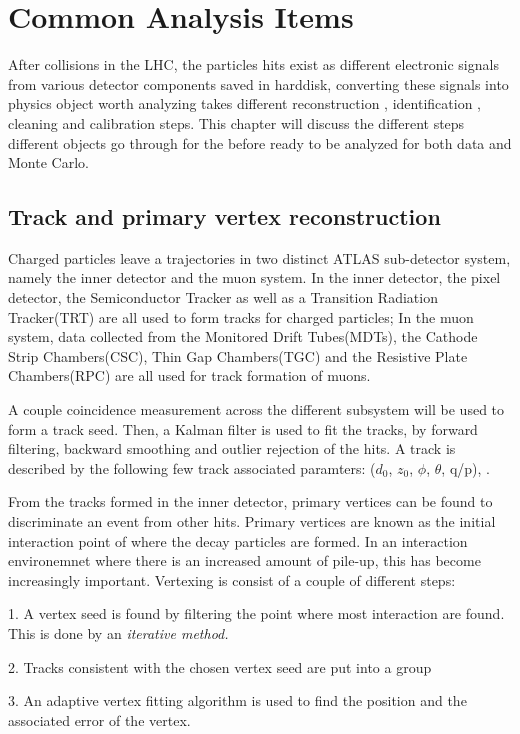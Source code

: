 \chapter{Common Analysis Items}
After collisions in the LHC, the particles hits exist as different electronic signals from various detector components saved in harddisk, converting these signals into physics object worth analyzing takes different reconstruction , identification , cleaning and calibration steps. This chapter will discuss the different steps different objects go through for the before ready to be analyzed for both data and Monte Carlo. 

\section{Track and primary vertex reconstruction}

Charged particles leave a trajectories in two distinct ATLAS sub-detector system, namely the inner detector and the muon system. In the inner detector, the pixel detector, the Semiconductor Tracker as well as a Transition Radiation Tracker(TRT) are all used to form tracks for charged particles; In the muon system, data collected from the Monitored Drift Tubes(MDTs), the Cathode Strip Chambers(CSC), Thin Gap Chambers(TGC) and the Resistive Plate Chambers(RPC) are all used for
track formation of muons. 

A couple coincidence measurement across the different subsystem will be used to form a track seed. Then, a Kalman filter is used to fit the tracks, by forward filtering, backward smoothing and outlier rejection of the hits.  A track is described by the following few track associated paramters: ($d_{0}$, $z_{0}$, $\phi$, $\theta$, q/p), 
.~\cite{}

From the tracks formed in the inner detector, primary vertices can be found to discriminate an event from other hits. 
Primary vertices are known as the initial interaction point of where the decay particles are formed. In an interaction environemnet where there is an increased amount of pile-up, this has become increasingly important. Vertexing is consist of a couple of different steps:

1. A vertex seed is found by filtering the point where most interaction are found. This is done by an \it iterative method.  

2. Tracks consistent with the chosen vertex seed are put into a group

3. An adaptive vertex fitting algorithm is used to find the position and the associated error of the vertex. 

